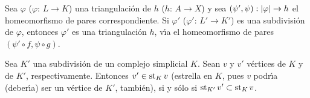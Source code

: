 \begin{obsTriangularPorSubdivisiones}\label{obs:triangularporsubdivisiones}
	Sea $\varphi$ ($\varphi:\,L\rightarrow K$) una triangulaci\'{o}n de
	$h$ ($h:\,A\rightarrow X$) y sea
	$(\psi',\psi):\geom{\varphi}\rightarrow h$ el homeomorfismo de pares
	correspondiente. Si $\varphi'$ ($\varphi':\,L'\rightarrow K'$) es una
	subdivisi\'{o}n de $\varphi$, entonces $\varphi'$ es una
	triangulaci\'{o}n $h$, v\'{\i}a el homeomorfismo de pares
	$(\psi'\circ f,\psi\circ g)$.
	\begin{center}
	\end{center}
\end{obsTriangularPorSubdivisiones}

\begin{obsSubdivisionesYEstrellas}\label{obs:subdivisionesyestrellas}
	Sea $K'$ una subdivisi\'{o}n de un complejo simplicial $K$.
	Sean $v$ y $v'$ v\'{e}rtices de $K$ y de $K'$, respectivamente.
	Entonces $v'\in\estrella[K]{v}$ (estrella en $K$, pues $v$ podr\'{\i}a
	(deber\'{\i}a) ser un v\'{e}rtice de $K'$, tambi\'{e}n), si y s\'{o}lo
	si $\estrella[K']{v'}\subset\estrella[K]{v}$.
\end{obsSubdivisionesYEstrellas}
